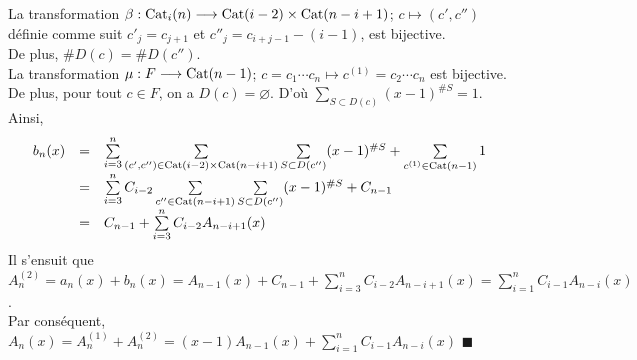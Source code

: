 La transformation $\beta: \begin{rm}Cat\end{rm}_{i}(n) \longrightarrow \begin{rm}Cat\end{rm}(i-2)\times \begin{rm}Cat\end{rm}(n-i+1)$; $c \longmapsto (c', c'')$ définie comme suit $c'_{j}=c_{j+1}$ et $c''_{j}=c_{i+j-1}-(i-1)$, est bijective.\\
De plus, $\#D(c) = \#D(c'')$. \vspace{5pt}\\
La transformation $\mu: F \longrightarrow \begin{rm}Cat\end{rm}(n-1)$; $c=c_{1}\cdots c_{n} \longmapsto c^{(1)}=c_{2}\cdots c_{n}$ est bijective. De plus, pour tout $c \in F$, on a $D(c)=\varnothing$. D'où $\sum\limits_{S\subset D(c)}(x-1)^{\#S}=1$.\vspace{10pt}\\
Ainsi,
$$
	\begin{array}{l l l}
		b_{n}(x) & = & \sum\limits_{i=3}^{n} \sum\limits_{(c', c'')\in \begin{rm}Cat\end{rm}(i-2)\times \begin{rm}Cat\end{rm}(n-i+1)} \sum\limits_{S\subset D(c'')}(x-1)^{\#S} + \sum\limits_{c^{(1)}\in \begin{rm}Cat\end{rm}(n-1)}1 \\
		         & = & \sum\limits_{i=3}^{n} C_{i-2}\sum\limits_{c'' \in \begin{rm}Cat\end{rm}(n-i+1)}\sum\limits_{S\subset D(c'')}(x-1)^{\#S} + C_{n-1}                                          \\
		         & = & C_{n-1} + \sum\limits_{i=3}^{n} C_{i-2}A_{n-i+1}(x)
	\end{array}
$$
Il s'ensuit que $A_{n}^{(2)}=a_{n}(x)+b_{n}(x)= A_{n-1}(x) + C_{n-1} + \sum\limits_{i=3}^{n} C_{i-2}A_{n-i+1}(x) = \sum\limits_{i=1}^{n}C_{i-1}A_{n-i}(x)$.\\
Par conséquent, $A_{n}(x)= A_{n}^{(1)} + A_{n}^{(2)} = (x-1)A_{n-1}(x) + \sum\limits_{i=1}^{n}C_{i-1}A_{n-i}(x)$ \hspace{5pt}$\blacksquare$

